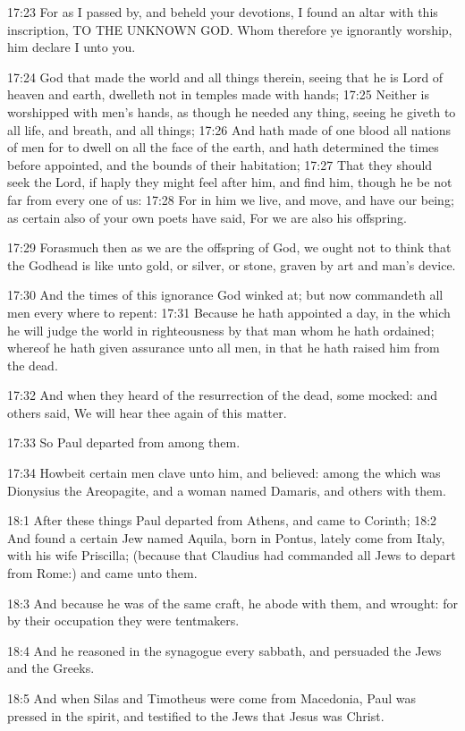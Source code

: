 17:23 For as I passed by, and beheld your devotions, I found an altar with this inscription, TO THE UNKNOWN GOD. Whom therefore ye ignorantly worship, him declare I unto you.

17:24 God that made the world and all things therein, seeing that he is Lord of heaven and earth, dwelleth not in temples made with hands; 17:25 Neither is worshipped with men's hands, as though he needed any thing, seeing he giveth to all life, and breath, and all things; 17:26 And hath made of one blood all nations of men for to dwell on all the face of the earth, and hath determined the times before appointed, and the bounds of their habitation; 17:27 That they should seek the Lord, if haply they might feel after him, and find him, though he be not far from every one of us: 17:28 For in him we live, and move, and have our being; as certain also of your own poets have said, For we are also his offspring.

17:29 Forasmuch then as we are the offspring of God, we ought not to think that the Godhead is like unto gold, or silver, or stone, graven by art and man's device.

17:30 And the times of this ignorance God winked at; but now commandeth all men every where to repent: 17:31 Because he hath appointed a day, in the which he will judge the world in righteousness by that man whom he hath ordained; whereof he hath given assurance unto all men, in that he hath raised him from the dead.

17:32 And when they heard of the resurrection of the dead, some mocked: and others said, We will hear thee again of this matter.

17:33 So Paul departed from among them.

17:34 Howbeit certain men clave unto him, and believed: among the which was Dionysius the Areopagite, and a woman named Damaris, and others with them.

18:1 After these things Paul departed from Athens, and came to Corinth; 18:2 And found a certain Jew named Aquila, born in Pontus, lately come from Italy, with his wife Priscilla; (because that Claudius had commanded all Jews to depart from Rome:) and came unto them.

18:3 And because he was of the same craft, he abode with them, and wrought: for by their occupation they were tentmakers.

18:4 And he reasoned in the synagogue every sabbath, and persuaded the Jews and the Greeks.

18:5 And when Silas and Timotheus were come from Macedonia, Paul was pressed in the spirit, and testified to the Jews that Jesus was Christ.

